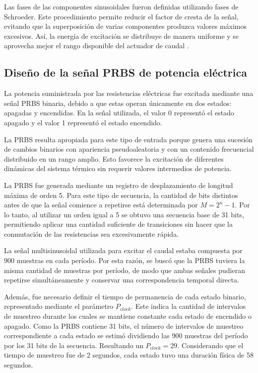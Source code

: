 \documentclass[11pt]{report}
\begin{document}
Las fases de las componentes sinusoidales fueron definidas utilizando fases de Schroeder. Este procedimiento permite reducir el factor de cresta de la señal, evitando que la superposición de varias componentes produzca valores máximos excesivos. Así, la energía de excitación se distribuye de manera uniforme y se aprovecha mejor el rango disponible del actuador de caudal \cite{ljung1999system}.





\subsection{Diseño de la señal PRBS de potencia eléctrica}

La potencia suministrada por las resistencias eléctricas fue excitada mediante una señal PRBS binaria, debido a que estas operan únicamente en dos estados: apagadas y encendidas. En la señal utilizada, el valor 0 representó el estado apagado y el valor 1 representó el estado encendido.

La PRBS resulta apropiada para este tipo de entrada porque genera una sucesión de cambios binarios con apariencia pseudoaleatoria y con un contenido frecuencial distribuido en un rango amplio. Esto favorece la excitación de diferentes dinámicas del sistema térmico sin requerir valores intermedios de potencia.

La PRBS fue generada mediante un registro de desplazamiento de longitud máxima de orden 5. Para este tipo de secuencia, la cantidad de bits distintos antes de que la señal comience a repetirse está determinada por $M=2^n-1$. Por lo tanto, al utilizar un orden igual a 5 se obtuvo una secuencia base de 31 bits, permitiendo aplicar una cantidad suficiente de transiciones sin hacer que la conmutación de las resistencias sea excesivamente rápida. 

La señal multisinusoidal utilizada para excitar el caudal estaba compuesta por 900 muestras en cada período. Por esta razón, se buscó que la PRBS tuviera la misma cantidad de muestras por período, de modo que ambas señales pudieran repetirse simultáneamente y conservar una correspondencia temporal directa.

Además, fue necesario definir el tiempo de permanencia de cada estado binario, representado mediante el parámetro $P_{clock}$. Este indica la cantidad de intervalos de muestreo durante los cuales se mantiene constante cada estado de encendido o apagado. Como la PRBS contiene 31 bits, el número de intervalos de muestreo correspondiente a cada estado se estimó dividiendo las 900 muestras del período por los 31 bits de la secuencia. Resultando un $P_{clock}=29$. Considerando que el tiempo de muestreo fue de 2 segundos, cada estado tuvo una duración física de 58 segundos.
\end{document}
